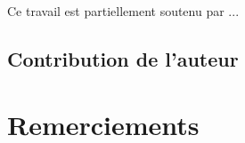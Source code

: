\documentclass[a4paper,alpha-refs]{jaisd}
\begin{document}
Ce travail est partiellement soutenu par ...

\subsection{Contribution de l'auteur}

\lipsum[5]

\section{Remerciements}


\lipsum[6] 


\end{document}
